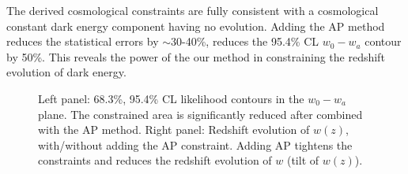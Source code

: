 \documentclass[prl,twocolumn,superscriptaddress,aps,amsmath,amssymb,nofootinbib,altaffilletter]{revtex4}
\begin{document}
The derived cosmological constraints are fully consistent with a cosmological constant dark energy component having no evolution.
Adding the AP method reduces the statistical errors by $\sim$30-40\%,
reduces the 95.4\% CL $w_0-w_a$ contour by 50\%.
This reveals the power of the our method in constraining the redshift evolution of dark energy.



\begin{figure}
   \caption{\label{fig_con}
   Left panel: 68.3\%, 95.4\% CL likelihood contours in the  $w_0-w_a$ plane.
   The constrained area is significantly reduced after combined with the AP method.
   Right panel: Redshift evolution of $w(z)$, with/without adding the AP constraint.
   Adding AP tightens the constraints and reduces the redshift evolution of $w$ (tilt of $w(z)$).
   }
\end{figure}
\end{document}
